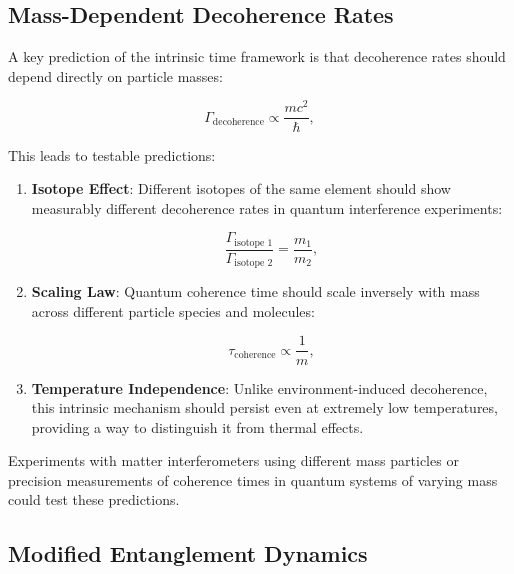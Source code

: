 \documentclass[12pt,a4paper]{article}
\begin{document}
	\subsection{Mass-Dependent Decoherence Rates}
	\label{subsec:mass_dependent_decoherence}
	
	A key prediction of the intrinsic time framework is that decoherence rates should depend directly on particle masses:
	
	\begin{equation}
		\Gamma_{\text{decoherence}} \propto \frac{m c^2}{\hbar},
		\label{eq:decoherence_mass}
	\end{equation}
	
	This leads to testable predictions:
	
	\begin{enumerate}
		\item \textbf{Isotope Effect}: Different isotopes of the same element should show measurably different decoherence rates in quantum interference experiments:
		
		\begin{equation}
			\frac{\Gamma_{\text{isotope 1}}}{\Gamma_{\text{isotope 2}}} = \frac{m_1}{m_2},
			\label{eq:isotope_ratio}
		\end{equation}
		
		\item \textbf{Scaling Law}: Quantum coherence time should scale inversely with mass across different particle species and molecules:
		
		\begin{equation}
			\tau_{\text{coherence}} \propto \frac{1}{m},
			\label{eq:coherence_scaling}
		\end{equation}
		
		\item \textbf{Temperature Independence}: Unlike environment-induced decoherence, this intrinsic mechanism should persist even at extremely low temperatures, providing a way to distinguish it from thermal effects.
	\end{enumerate}
	
	Experiments with matter interferometers using different mass particles \cite{Arndt1999, Hornberger2012, Fein2019} or precision measurements of coherence times in quantum systems of varying mass could test these predictions.
	
	\subsection{Modified Entanglement Dynamics}
	\label{subsec:entanglement_dynamics}
	
\end{document}

